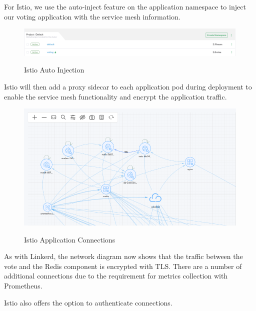 For Istio, we use the auto-inject feature on the application namespace to inject our voting application with the service mesh information.

\begin{figure}[H]
\centering
\caption {Istio Auto Injection}
\includegraphics[width=\linewidth]{images/istio-inject.png}
\label{fig:istioInject}
\end{figure}

Istio will then add a proxy sidecar to each application pod during deployment to enable the service mesh functionality and encrypt the application traffic.

\begin{figure}[H]
\centering
\caption {Istio Application Connections}
\includegraphics[width=\linewidth]{images/istio-map.png}
\label{fig:IstioMap}
\end{figure}

As with Linkerd, the network diagram now shows that the traffic between the vote and the Redis component is encrypted with TLS. There are a number of additional connections due to the requirement for metrics collection with Prometheus.

Istio also offers the option to authenticate connections.
